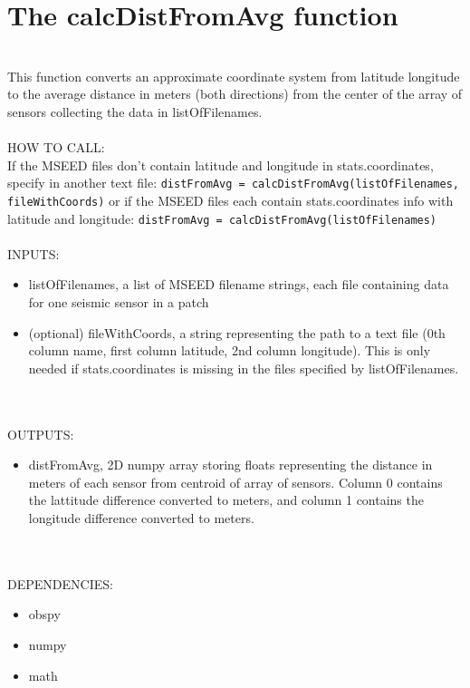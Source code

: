 \documentclass{article}
\begin{document}
\section{The calcDistFromAvg function}
\\
This function converts an approximate coordinate system from latitude longitude to the average distance in meters (both directions) from the center of the array of sensors collecting the data in listOfFilenames.
\\
\\
HOW TO CALL:
\\
If the MSEED files don't contain latitude and longitude in stats.coordinates, specify in another text file:
\texttt{distFromAvg = calcDistFromAvg(listOfFilenames, fileWithCoords)}
or if the MSEED files each contain stats.coordinates info with latitude and longitude:
\texttt{distFromAvg = calcDistFromAvg(listOfFilenames)}
\\
\\
INPUTS:
\begin{itemize}
    \item listOfFilenames, a list of MSEED filename strings, each file containing data for one seismic sensor in a patch
    \item (optional) fileWithCoords, a string representing the path to a text file (0th column name, first column latitude, 2nd column longitude). This is only needed if stats.coordinates is missing in the files specified by listOfFilenames.
\end{itemize}
\\
\\
OUTPUTS:
\begin{itemize}
    \item distFromAvg, 2D numpy array storing floats representing the distance in meters of each sensor from centroid of array of sensors. Column 0 contains the lattitude difference converted to meters, and column 1 contains the longitude difference converted to meters.
\end{itemize}
\\
\\
DEPENDENCIES:
\begin{itemize}
    \item obspy
    \item numpy
    \item math
\end{itemize}
\\
\\
\end{document}

